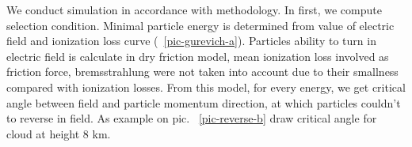 \documentclass{webofc}
\begin{document}
    
    
    We conduct simulation in accordance with methodology. In first, we compute selection condition. Minimal particle energy is determined from value of electric field and ionization loss curve (~\ref{pic-gurevich-a}). Particles ability to turn in electric field is calculate in dry friction model, mean ionization loss involved as friction force, bremsstrahlung were not taken into account due to their smallness compared with ionization losses. From this model, for every energy, we get critical angle between field and particle momentum direction, at which particles couldn't to reverse in field. As example on pic. ~\ref{pic-reverse-b} draw critical angle for cloud at height 8 km.
    
\end{document}
